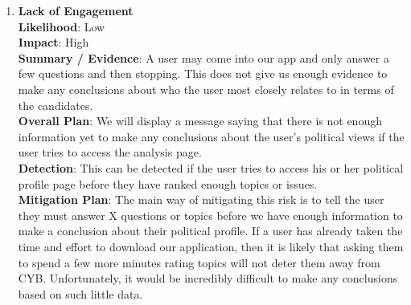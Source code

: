 \documentclass[11pt]{article}
\begin{document}
\begin{enumerate}[nolistsep]
    \item \textbf{Lack of Engagement}\\
        \textbf{Likelihood}: Low\\
        \textbf{Impact}: High\\
        \textbf{Summary / Evidence}: A user may come into our app and only answer a few questions and then stopping. This does not give us enough evidence to make any conclusions about who the user most closely relates to in terms of the candidates. \\
        \textbf{Overall Plan}: We will display a message saying that there is not enough information yet to make any conclusions about the user's political views if the user tries to access the analysis page. \\
        \textbf{Detection}: This can be detected if the user tries to access his or her political profile page before they have ranked enough topics or issues.\\
        \textbf{Mitigation Plan}: The main way of mitigating this risk is to tell the user they must answer X questions or topics before we have enough information to make a conclusion about their political profile. If a user has already taken the time and effort to download our application, then it is likely that asking them to spend a few more minutes rating topics will not deter them away from CYB. Unfortunately, it would be incredibly difficult to make any conclusions based on such little data.\\[-10pt]


\end{enumerate}
\end{document}
